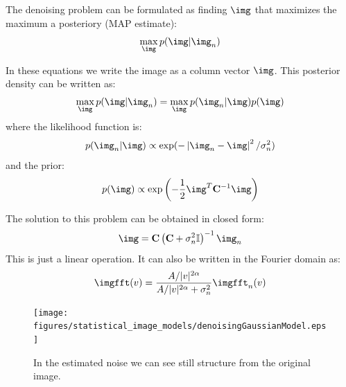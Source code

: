The denoising problem can be formulated as finding $\img$ that maximizes the maximum a posteriory (MAP estimate):
\begin{equation}
  \max_\img p(\img | \img_n)
\end{equation}

In these equations we write the image as a column vector $\img$. This posterior density can be written as:
\begin{equation}
  \max_\img p(\img | \img_n) = \max_\img p(\img_n | \img) p(\img)
\end{equation}
where the likelihood function is:
\begin{equation}
  p(\img_n | \img) \propto \exp( - \left| \img_n - \img \right| ^2 / \sigma_n^2)
\end{equation}
and the prior:
\begin{equation}
  p(\img) \propto \exp \left(-\frac{1}{2} \img^T {\bf C}^{-1} \img \right)
\end{equation}

The solution to this problem can be obtained in closed form:
\begin{equation}
  \img = {\bf C} \left( {\bf C} + \sigma_n^2   \mathbb{I} \right)^{-1} \img_n
\end{equation}
This is just a linear operation. It can also be written in the Fourier domain as:
\begin{equation}
  \imgfft(v) = \frac{A/|v|^{2\alpha}}{A/|v|^{2\alpha} + \sigma_n^2} \imgfft_n(v)
\end{equation}


\begin{figure}[htpb]
  \centerline{
    \texttt{[image: figures/statistical\_image\_models/denoisingGaussianModel.eps]}
  }
  \caption{In the estimated noise we can see still structure from the original image.}
  \label{fig:denoisingGaussianModel}
\end{figure}











